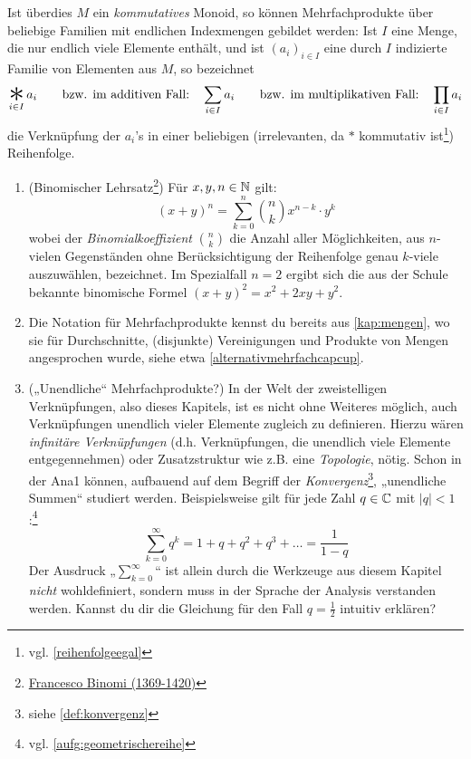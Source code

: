 \begin{nota}[Mehrfachprodukte]
    Ist überdies $M$ ein \emph{kommutatives} Monoid, so können Mehrfachprodukte über beliebige Familien mit endlichen Indexmengen gebildet werden: Ist $I$ eine Menge, die nur endlich viele Elemente enthält, und ist $(a_i)_{i\in I}$ eine durch $I$ indizierte Familie von Elementen aus $M$, so bezeichnet
        \[ \mathop{\raisebox{-0.6ex}{\scalebox{2.5}{$*$}}}_{i\in I} a_i \qquad\text{bzw. im additiven Fall:}\quad \sum_{i\in I} a_i \qquad\text{bzw. im multiplikativen Fall:}\quad \prod_{i\in I} a_i\]
    die Verknüpfung der $a_i$'s in einer beliebigen (irrelevanten, da $*$ kommutativ ist\footnote{vgl. \cref{reihenfolgeegal}}) Reihenfolge.
\end{nota}


\begin{bsp} \quad
    \begin{enumerate}
        \item(Binomischer Lehrsatz\footnote{\href{https://www.youtube.com/watch?v=462dkfAvlGo}{Francesco Binomi (1369-1420)}}) Für $x,y,n\in \mathbb N$ gilt:
            \[ (x+y)^n = \sum_{k=0}^n \binom{n}{k} x^{n-k}\cdot y^k \]
        wobei der \emph{Binomialkoeffizient} $\binom{n}{k}$ die Anzahl aller Möglichkeiten, aus $n$-vielen Gegenständen ohne Berücksichtigung der Reihenfolge genau $k$-viele auszuwählen, bezeichnet. Im Spezialfall $n=2$ ergibt sich die aus der Schule bekannte binomische Formel $(x+y)^2=x^2+2xy+y^2$.
        \item Die Notation für Mehrfachprodukte kennst du bereits aus \cref{kap:mengen}, wo sie für Durchschnitte, (disjunkte) Vereinigungen und Produkte von Mengen angesprochen wurde, siehe etwa \cref{alternativmehrfachcapcup}.
        \item(„Unendliche“ Mehrfachprodukte?) In der Welt der zweistelligen Verknüpfungen, also dieses Kapitels, ist es nicht ohne Weiteres möglich, auch Verknüpfungen unendlich vieler Elemente zugleich zu definieren. Hierzu wären \emph{infinitäre Verknüpfungen} (d.h. Verknüpfungen, die unendlich viele Elemente entgegennehmen) oder Zusatzstruktur wie z.B. eine \emph{Topologie}, nötig. Schon in der Ana1 können, aufbauend auf dem Begriff der \emph{Konvergenz}\footnote{siehe \cref{def:konvergenz}}, „unendliche Summen“ studiert werden. Beispielsweise gilt für jede Zahl $q\in \mathbb C$ mit $\vert q\vert < 1$:\footnote{vgl. \cref{aufg:geometrischereihe}}
            \[ \sum_{k=0}^\infty q^k = 1 + q + q^2 + q^3 + \ldots = \frac{1}{1-q} \]
        Der Ausdruck „$\sum_{k=0}^\infty$“ ist allein durch die Werkzeuge aus diesem Kapitel \emph{nicht} wohldefiniert, sondern muss in der Sprache der Analysis verstanden werden. Kannst du dir die Gleichung für den Fall $q=\frac{1}{2}$ intuitiv erklären?
    \end{enumerate}
\end{bsp}





